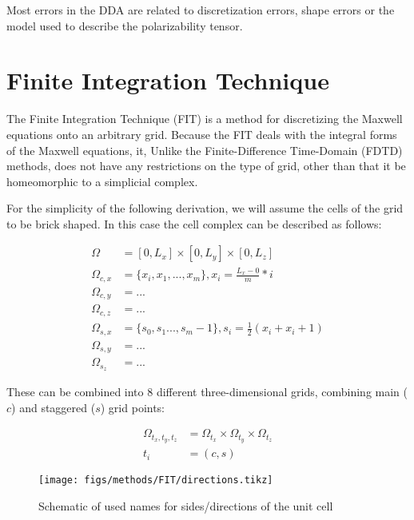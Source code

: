     Most errors in the DDA are related to discretization errors, shape errors or the model used to describe the polarizability tensor.



\section{Finite Integration Technique}
\label{ap:FIT}
    The Finite Integration Technique (FIT) is a method for discretizing the Maxwell equations onto an arbitrary
    grid\cite{weiland2001discrete}.  Because the FIT deals with the integral forms of the Maxwell equations, it,
    Unlike the Finite-Difference Time-Domain (FDTD) methods, does not have any restrictions on the type of grid,
    other than that it be homeomorphic to a simplicial complex.

    For the simplicity of the following derivation\cite{rahimi2011finite}, we will assume the cells of the grid to be brick shaped. In this
    case the cell complex can be described as follows:

    \begin{align}
        \Omega &= [0, L_x]\times[0, L_y]\times[0, L_z] \\
        \Omega_{c,x} &= \{x_i, x_1, ..., x_m\}, x_i = \frac{L_x - 0}{m}*i \\
        \Omega_{c,y} &= ... \\
        \Omega_{c,z} &= ... \\
        \Omega_{s,x} &= \{s_0, s_1 ..., s_m-1\}, s_i = \frac{1}{2}(x_i + x_i+1) \\
        \Omega_{s,y} &= ... \\
        \Omega_{s_z} &= ...
    \end{align}

    These can be combined into 8 different three-dimensional grids, combining main ($c$) and staggered ($s$) grid points:

    \begin{align}
        \Omega_{t_x, t_y, t_z} &= \Omega_{t_x}\times\Omega_{t_y}\times\Omega_{t_z}\\
        t_i &= (c, s)
    \end{align}


    \begin{figure}
        \centering
        \texttt{[image: figs/methods/FIT/directions.tikz]}
        \caption{Schematic of used names for sides/directions of the unit cell}
        \label{fig:Dir_Int}
    \end{figure}


